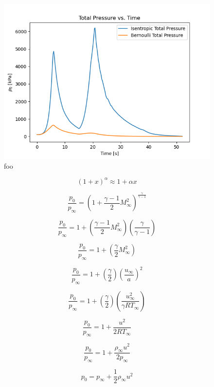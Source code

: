 \documentclass[../main.tex]{subfiles}
\begin{document}
\begin{figure}[h]
    \centering
    \includegraphics[scale=.7]{../../images/problem_1/Pt_vs_Time_Isen_Bernoulli.png}
    \caption{foo}
    \label{rho_rho_t_vs_Mach}
\end{figure}

\[
    \left({1 + x}\right)^\alpha \approx 1 + \alpha x  
\]

\[
    \frac{p_0}{p_\infty} = {\left({1 + \frac{\gamma-1}{2}M_\infty^2}\right)} ^ {\frac{\gamma}{\gamma-1}}  
\]

\[
    \frac{p_0}{p_\infty} = 1 + \left({\frac{\gamma-1}{2}M_\infty^2}\right) \left({\frac{\gamma}{\gamma-1}}\right)
\]

\[
    \frac{p_0}{p_\infty} = 1 + \left({\frac{\gamma}{2}M_\infty^2}\right) 
\]

\[
    \frac{p_0}{p_\infty} = 1 + \left({\frac{\gamma}{2}}\right)\left({{\frac{u_\infty}{a}}}\right)^2 
\]

\[
    \frac{p_0}{p_\infty} = 1 + \left({\frac{\gamma}{2}}\right)\left({{\frac{u_\infty^2}{\gamma R T_\infty}}}\right) 
\]

\[
    \frac{p_0}{p_\infty} = 1 + \frac{u^2}{2RT_\infty}
\]

\[
    \frac{p_0}{p_\infty} = 1 + \frac{\rho_\infty u^2}{2p_\infty}
\]

\[
    p_0 = p_\infty + \frac{1}{2} \rho_\infty u^2
\]
\end{document}
